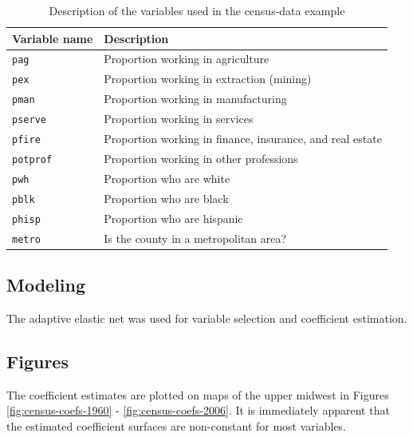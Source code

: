 \documentclass[authoryear, review, 11pt]{elsarticle}
\begin{document}
	\begin{table}
		\begin{center}
		\begin{tabular}{ll}
			Variable name & Description \\
			\hline
			\verb!pag! & Proportion working in agriculture\\
			\verb!pex! &  Proportion working in extraction (mining)\\
			\verb!pman! & Proportion working in manufacturing \\
			\verb!pserve! & Proportion working in services \\
			\verb!pfire! & Proportion working in finance, insurance, and real estate \\
			\verb!potprof! & Proportion working in other professions \\
			\verb!pwh! & Proportion who are white \\
			\verb!pblk! & Proportion who are black \\
			\verb!phisp! & Proportion who are hispanic \\
			\verb!metro! & Is the county in a metropolitan area?\\
		\end{tabular}
		\caption{Description of the variables used in the census-data example\label{table:census-vars}}
		\end{center}		
	\end{table}
	
	\subsection{Modeling}	
	The adaptive elastic net was used for variable selection and coefficient estimation. 
	
	\subsection{Figures}
	The coefficient estimates are plotted on maps of the upper midwest in Figures \ref{fig:census-coefs-1960} - \ref{fig:census-coefs-2006}. It is immediately apparent that the estimated coefficient surfaces are non-constant for most variables.\\
\end{document}
